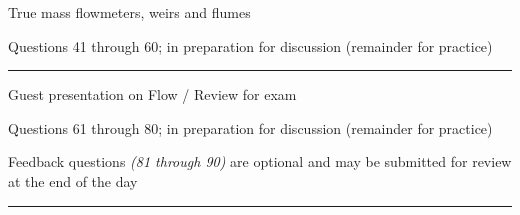 \vskip 5pt



\vskip 2pt  True mass flowmeters, weirs and flumes

\vskip 2pt \noindent Questions 41 through 60;  in preparation for discussion (remainder for practice)

\vskip 10pt




\filbreak
\hrule \vskip 5pt
\noindent {}

\vskip 5pt


\vskip 2pt  Guest presentation on Flow / Review for exam

\vskip 2pt \noindent Questions 61 through 80;  in preparation for discussion (remainder for practice)

\vskip 5pt

\noindent Feedback questions {\it (81 through 90)} are optional and may be submitted for review at the end of the day

\vskip 10pt



\filbreak
\hrule \vskip 5pt
\noindent {}

\vskip 5pt


\vskip 10pt



\vfil \eject

